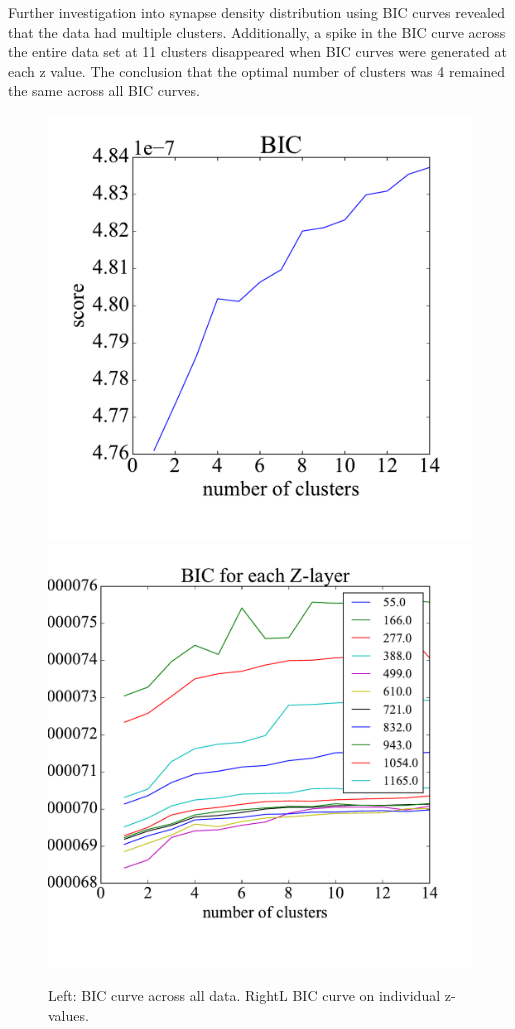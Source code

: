 \documentclass{article}
\begin{document}
Further investigation into synapse density distribution using BIC curves revealed that the data had multiple clusters. Additionally, a spike in the BIC curve across the entire data set at 11 clusters disappeared when BIC curves were generated at each z value. The conclusion that the optimal number of clusters was 4 remained the same across all BIC curves.

\begin{figure}[h]
  \centering
  \includegraphics[scale = .3]{Fig10}
  \includegraphics[scale=.3]{Fig12}
  \caption{Left: BIC curve across all data. RightL BIC curve on individual z-values.}
\end{figure}
\end{document}
